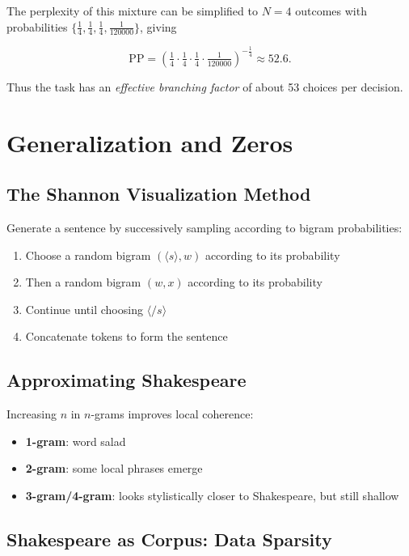 \documentclass[11pt,a4paper]{article}
\theoremstyle{definition}
\theoremstyle{plain}
\theoremstyle{remark}
\begin{document}
The perplexity of this mixture can be simplified to $N=4$ outcomes with probabilities
$\{\tfrac{1}{4},\tfrac{1}{4},\tfrac{1}{4},\tfrac{1}{120000}\}$, giving

\[
\text{PP} = \left(\tfrac{1}{4}\cdot \tfrac{1}{4}\cdot \tfrac{1}{4}\cdot \tfrac{1}{120000}\right)^{-\tfrac{1}{4}} \approx 52.6.
\]

Thus the task has an \emph{effective branching factor} of about 53 choices per decision.

\section{Generalization and Zeros}

\subsection{The Shannon Visualization Method}

Generate a sentence by successively sampling according to bigram probabilities:
\begin{enumerate}
    \item Choose a random bigram $(\langle s \rangle, w)$ according to its probability
    \item Then a random bigram $(w,x)$ according to its probability
    \item Continue until choosing $\langle /s \rangle$
    \item Concatenate tokens to form the sentence
\end{enumerate}

\subsection{Approximating Shakespeare}

Increasing $n$ in $n$-grams improves local coherence:
\begin{itemize}
    \item \textbf{1-gram}: word salad
    \item \textbf{2-gram}: some local phrases emerge
    \item \textbf{3-gram/4-gram}: looks stylistically closer to Shakespeare, but still shallow
\end{itemize}

\subsection{Shakespeare as Corpus: Data Sparsity}
\end{document}
